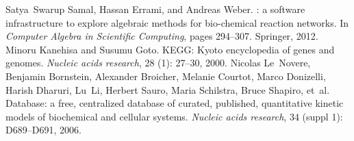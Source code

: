 \documentclass[12pt]{article}
\begin{document}
\begin{thebibliography}{21}
 Satya~Swarup Samal, Hassan Errami, and Andreas
  Weber.  : a software infrastructure to explore algebraic
  methods for bio-chemical reaction networks.  \newblock In \emph{Computer
    Algebra in Scientific Computing}, pages 294--307.  Springer, 2012.
 Minoru Kanehisa and Susumu Goto.  \newblock
  {KEGG}: {K}yoto encyclopedia of genes and genomes.  \newblock \emph{Nucleic
    acids research}, 28 (1): 27--30, 2000.
 Nicolas Le~Novere, Benjamin
  Bornstein, Alexander Broicher, Melanie Courtot, Marco Donizelli, Harish
  Dharuri, Lu~Li, Herbert Sauro, Maria Schilstra, Bruce Shapiro, et~al.
   {D}atabase: a free, centralized database of curated,
  published, quantitative kinetic models of biochemical and cellular systems.
  \newblock \emph{Nucleic acids research}, 34 (suppl 1):
  D689--D691, 2006.
\end{thebibliography}
\end{document}
